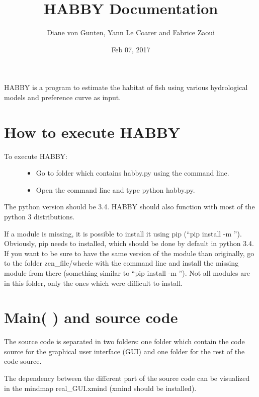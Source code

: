 \documentclass[letterpaper,10pt,english]{sphinxmanual}
\title{HABBY Documentation}
\date{Feb 07, 2017}
\author{Diane von Gunten, Yann Le Coarer and Fabrice Zaoui}
\begin{document}
\maketitle
\sphinxtableofcontents
{}\label{\detokenize{index::doc}}


HABBY is a program to estimate the habitat of fish using various hydrological models and preference curve as input.


\chapter{How to execute HABBY}
\label{\detokenize{index:welcome-to-habby-s-documentation}}\label{\detokenize{index:how-to-execute-habby}}\begin{description}
\item[{To execute HABBY:}] \leavevmode\begin{itemize}
\item {} 
Go to folder which contains habby.py using the command line.

\item {} 
Open the command line and type python habby.py.

\end{itemize}

\end{description}

The python version should be 3.4. HABBY should also function with most of the python 3 distributions.

If a module is missing, it is possible to install it using pip (``pip install -m ''). Obviously, pip needs to installed, which should be done by default in python 3.4. If you want to be sure to have the same version of the module than originally, go to the folder zen\_file/wheele with the command line and install the missing module from there (something similar to ``pip install -m ''). Not all modules are in this folder, only the ones which were difficult to install.


\chapter{Main(   ) and source code}
\label{\detokenize{index:main-and-source-code}}
The source code is separated in two folders: one folder which contain the code source for the graphical user interface (GUI) and one folder for the rest of the code source.

The dependency between the different part of the source code can be visualized in the mindmap real\_GUI.xmind (xmind should be installed).
\end{document}
